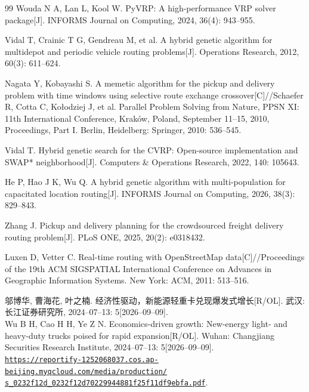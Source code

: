 \documentclass{setp-new}
\begin{document}
\begin{thebibliography}{99}
 Wouda N A, Lan L, Kool W. PyVRP: A high-performance VRP solver package[J]. INFORMS Journal on Computing, 2024, 36(4): 943--955.

 Vidal T, Crainic T G, Gendreau M, et al. A hybrid genetic algorithm for multidepot and periodic vehicle routing problems[J]. Operations Research, 2012, 60(3): 611--624.

 Nagata Y, Kobayashi S. A memetic algorithm for the pickup and delivery problem with time windows using selective route exchange crossover[C]//Schaefer R, Cotta C, Ko{\l}odziej J, et al. Parallel Problem Solving from Nature, PPSN XI: 11th International Conference, Krak{\'o}w, Poland, September 11--15, 2010, Proceedings, Part I. Berlin, Heidelberg: Springer, 2010: 536--545.

 Vidal T. Hybrid genetic search for the CVRP: Open-source implementation and SWAP* neighborhood[J]. Computers \& Operations Research, 2022, 140: 105643.

 He P, Hao J K, Wu Q. A hybrid genetic algorithm with multi-population for capacitated location routing[J]. INFORMS Journal on Computing, 2026, 38(3): 829--843.

 Zhang J. Pickup and delivery planning for the crowdsourced freight delivery routing problem[J]. PLoS ONE, 2025, 20(2): e0318432.

 Luxen D, Vetter C. Real-time routing with OpenStreetMap data[C]//Proceedings of the 19th ACM SIGSPATIAL International Conference on Advances in Geographic Information Systems. New York: ACM, 2011: 513--516.

 邬博华, 曹海花, 叶之楠. 经济性驱动，新能源轻重卡兑现爆发式增长\mbox{[R/OL]}. 武汉: 长江证券研究所, 2024--07--13: 5[2026--09--09].\\
Wu B H, Cao H H, Ye Z N. Economics-driven growth: New-energy light- and heavy-duty trucks poised for rapid expansion\mbox{[R/OL]}. Wuhan: Changjiang Securities Research Institute, 2024--07--13: 5[2026--09--09].\\
\href{https://reportify-1252068037.cos.ap-beijing.myqcloud.com/media/production/s_0232f12d_0232f12d70229944881f25f11df9ebfa.pdf}{%
\nolinkurl{https://reportify-1252068037.cos.ap-beijing.myqcloud.com/media/production/}\\
\nolinkurl{s_0232f12d_0232f12d70229944881f25f11df9ebfa.pdf}}.



\end{thebibliography}
\end{document}
